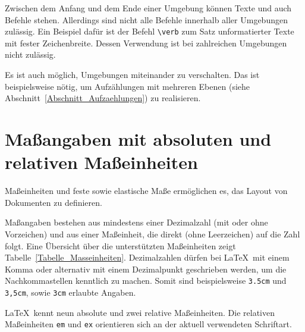 Zwischen dem Anfang und dem Ende einer Umgebung können Texte und auch
Befehle stehen. Allerdings sind nicht alle Befehle innerhalb aller
Umgebungen zulässig. Ein Beispiel dafür ist der Befehl \verb!\verb! zum
Satz unformatierter Texte mit fester Zeichenbreite. Dessen Verwendung ist bei zahlreichen Umgebungen nicht zulässig.

Es ist auch möglich, Umgebungen miteinander zu verschalten. Das ist beispielsweise nötig, um Aufzählungen mit mehreren Ebenen (siehe Abschnitt~\ref{Abschnitt_Aufzaehlungen}) zu realisieren.



\section{Maßangaben mit absoluten und relativen Maßeinheiten}

Maßeinheiten und feste sowie elastische Maße ermöglichen es, das Layout von Dokumenten zu definieren. 

Maßangaben bestehen aus mindestens einer Dezimalzahl (mit oder ohne Vorzeichen) und aus einer 
Maßeinheit, die direkt (ohne Leerzeichen) auf die Zahl folgt. Eine Übersicht über die unterstützten Maßeinheiten zeigt Tabelle~\ref{Tabelle_Masseinheiten}. Dezimalzahlen dürfen bei \LaTeX\ mit einem Komma oder alternativ mit einem Dezimalpunkt geschrieben werden, um die Nachkommastellen kenntlich zu machen. Somit sind beispielsweise \verb!3.5cm! und 
\verb!3,5cm!, sowie \verb!3cm! erlaubte Angaben.

\LaTeX\ kennt neun absolute und zwei relative Maßeinheiten. Die relativen Maßeinheiten \verb!em! und \verb!ex! orientieren sich an der aktuell verwendeten Schriftart. 



